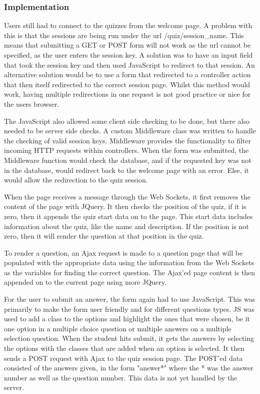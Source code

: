\subsubsection{Implementation}
Users still had to connect to the quizzes from the welcome page. A problem with this is that the sessions are being run under the url /quiz/session\_name. This means that submitting a GET or POST form will not work as the url cannot be specified, as the user enters the session key. A solution was to have an input field that took the session key and then used JavaScript to redirect to that session. An alternative solution would be to use a form that redirected to a controller action that then itself redirected to the correct session page. Whilst this method would work, having multiple redirections in one request is not good practice or nice for the users browser.

The JavaScript also allowed some client side checking to be done, but there also needed to be server side checks. A custom Middleware class was written to handle the checking of valid session keys. Middleware provides the functionality to filter incoming HTTP requests within controllers\cite{laravel-middleware}. When the form was submitted, the Middleware function would check the database, and if the requested key was not in the database, would redirect back to the welcome page with an error. Else, it would allow the redirection to the quiz session.

When the page receives a message through the Web Sockets, it first removes the content of the page with JQuery. It then checks the position of the quiz, if it is zero, then it appends the quiz start data on to the page. This start data includes information about the quiz, like the name and description. If the position is not zero, then it will render the question at that position in the quiz.

To render a question, an Ajax request is made to a question page that will be populated with the appropriate data using the information from the Web Sockets as the variables for finding the correct question. The Ajax'ed page content is then appended on to the current page using more JQuery.

For the user to submit an answer, the form again had to use JavaScript. This was primarily to make the form user friendly and for different questions types. JS was used to add a class to the options and highlight the ones that were chosen, be it one option in a multiple choice question or multiple answers on a multiple selection question. When the student hits submit, it gets the answers by selecting the options with the classes that are added when an option is selected. It then sends a POST request with Ajax to the quiz session page. The POST'ed data consisted of the answers given, in the form "answer*" where the * was the answer number as well as the question number. This data is not yet handled by the server.

